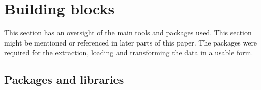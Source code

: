 \begin{comment}
The data that logs can include can be numerical data and non-numerical data
\setlength{\parindent}{3ex}  When we view the 

\cite{Xu2009DetectingLogs}

By comparing a traditional news source with
Topic modelling is a very popular and high researched field. While topic modelling  
An interesting adaptation of topic modelling can be found in twitter and cyber security. Twitter is a interesting field of research with real time tweets and a huge community. Due to the nature of twitter, analysing the huge stream of tweets can be a challenging and exhaustive task. A model with LDA has been introduced to analyse and detect topics. This model is an interesting way to provide news feeds even quicker then traditional news sites. Cyber security has also been an area which LDA seems applicable to. Through the usage of Big data and combination of LDA, users could be identified through system and network logs. Using the event logs to identify topics, new events of users could be identified as malicious or normal 

\end{comment}

\section{Building blocks} \label{research:buildingblocks}
This section has an oversight of the main tools and packages used. This section might be mentioned or referenced in later parts of this paper. The packages were required for the extraction, loading and transforming the data in a usable form.

\subsection{Packages and libraries}

